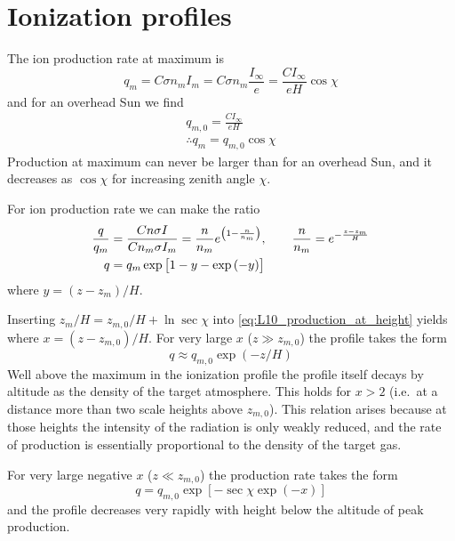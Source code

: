 \section{Ionization profiles}
The ion production rate at maximum is
\begin{equation*}
    q_m=C\sigma n_m I_m=C\sigma n_m\frac{I_\infty}{e}=\frac{CI_\infty}{eH}\cos\chi
\end{equation*}
and for an overhead Sun we find
\begin{align*}
    q_{m,0}=\frac{CI_\infty}{eH}\\
    \therefore q_m=q_{m,0}\cos\chi
\end{align*}
Production at maximum can never be larger than for an overhead Sun, and it decreases as \(\cos\chi \) for increasing zenith angle \(\chi \).

For ion production rate we can make the ratio
\begin{align}
    \frac{q}{q_m}&=\frac{Cn\sigma I}{Cn_m\sigma I_m}=\frac{n}{n_m}e^{\left(1-\frac{n}{n_m}\right)},\qquad\frac{n}{n_m}=e^{-\frac{z-z_m}{H}}\notag \\
    q&=q_m\exp\left[1-y-\exp\left(-y\right)\right]\label{eq:L10_production_at_height}
\end{align}
where \(y=(z-z_m)/H\).

Inserting \(z_m/H=z_{m,0}/H+\ln\sec\chi \) into \cref{eq:L10_production_at_height} yields
where \(x=(z-z_{m,0})/H\). For very large \(x\) (\(z\gg z_{m,0}\)) the profile takes the form
\begin{equation*}
    q\approx q_{m,0}\exp\left(-z/H\right)
\end{equation*}
Well above the maximum in the ionization profile the profile itself decays by altitude as the density of the target atmosphere. This holds for \(x>2\) (i.e.\ at a distance more than two scale heights above \(z_{m,0}\)). This relation arises because at those heights the intensity of the radiation is only weakly reduced, and the rate of production is essentially proportional to the density of the target gas.

For very large negative \(x\) (\(z\ll z_{m,0}\)) the production rate takes the form
\begin{equation*}
    q=q_{m,0}\exp\left[-\sec\chi\exp\left(-x\right)\right]
\end{equation*}
and the profile decreases very rapidly with height below the altitude of peak production.

